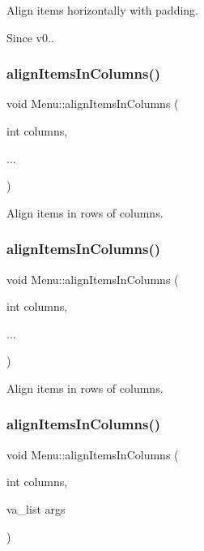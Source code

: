 Align items horizontally with padding. \begin{DoxySince}{Since}
v0.. 
\end{DoxySince}
\mbox{\label{classMenu_a73728acb4dd4cad8bdd8e895014aa522}} 
\subsubsection{\texorpdfstring{align\+Items\+In\+Columns()}{alignItemsInColumns()}\hspace{0.1cm}{\footnotesize\ttfamily [1/4]}}
{\footnotesize\ttfamily void Menu\+::align\+Items\+In\+Columns (\begin{DoxyParamCaption}\item[{int}]{columns,  }\item[{}]{... }\end{DoxyParamCaption})}

Align items in rows of columns. \mbox{\label{classMenu_a73728acb4dd4cad8bdd8e895014aa522}} 
\subsubsection{\texorpdfstring{align\+Items\+In\+Columns()}{alignItemsInColumns()}\hspace{0.1cm}{\footnotesize\ttfamily [2/4]}}
{\footnotesize\ttfamily void Menu\+::align\+Items\+In\+Columns (\begin{DoxyParamCaption}\item[{int}]{columns,  }\item[{}]{... }\end{DoxyParamCaption})}

Align items in rows of columns. \mbox{\label{classMenu_a2a568b7bfe853e3c73acba7e3622d220}} 
\subsubsection{\texorpdfstring{align\+Items\+In\+Columns()}{alignItemsInColumns()}\hspace{0.1cm}{\footnotesize\ttfamily [3/4]}}
{\footnotesize\ttfamily void Menu\+::align\+Items\+In\+Columns (\begin{DoxyParamCaption}\item[{int}]{columns,  }\item[{va\+\_\+list}]{args }\end{DoxyParamCaption})}

